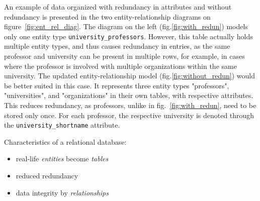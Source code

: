 \documentclass[11pt]{article}
\begin{document}
    An example of data organized with redundancy in attributes and without redundancy is presented in the two entity-relationship diagrams on figure~\ref{fig:ent_rel_diag}.
    The diagram on the left (fig.\ref{fig:with_redun}) models only one entity type \textemdash \texttt{university\_professors}.
    However, this table actually holds multiple entity types, and thus causes redundancy in entries, as the same professor and university can be present in multiple rows, for example, in cases where the professor is involved with multiple organizations within the same university.
    The updated entity-relationship model (fig.\ref{fig:without_redun}) would be better suited in this case.
    It represents three entity types \textemdash "professors", "universities", and "organizations" \textemdash in their own tables, with respective attributes.
    This reduces redundancy, as professors, unlike in fig.~\ref{fig:with_redun}, need to be stored only once.
    For each professor, the respective university is denoted through the \texttt{university\_shortname} attribute.

    \vspace{5mm}

    Characteristics of a relational database:
    \begin{itemize}
        \item real-life \textit{entities} become \textit{tables}
        \item reduced redundancy
        \item data integrity by \textit{relationships}
    \end{itemize}
\end{document}
